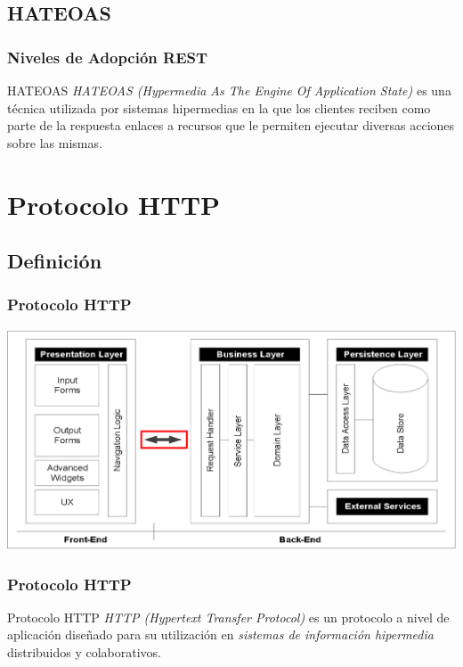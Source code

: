 \documentclass[a4paper,slidestop,xcolor=pst,blue]{beamer}
\begin{document}
\subsection{HATEOAS}

\begin{frame}[c]
    \frametitle{Niveles de Adopción REST}
    \begin{block}{HATEOAS}
        \emph{HATEOAS (Hypermedia As The Engine Of Application State)} es una técnica utilizada por sistemas hipermedias en la que los clientes reciben como parte de la respuesta enlaces a recursos que le permiten ejecutar diversas acciones sobre las mismas.
    \end{block}
\end{frame}

\section{Protocolo HTTP}

\subsection{Definición}

\begin{frame}[c]
    \frametitle{Protocolo HTTP}
    \begin{center}
        \includegraphics[width=\linewidth]{images/http/enterpriseArchitectures02.eps}
    \end{center}
\end{frame}

\begin{frame}[c]
    \frametitle{Protocolo HTTP}
    \begin{block}{Protocolo HTTP}
        \emph{HTTP (Hypertext Transfer Protocol)} es un protocolo a nivel de aplicación diseñado para su utilización en \emph{sistemas de información hipermedia} distribuidos y colaborativos.
    \end{block}
\end{frame}
\end{document}
